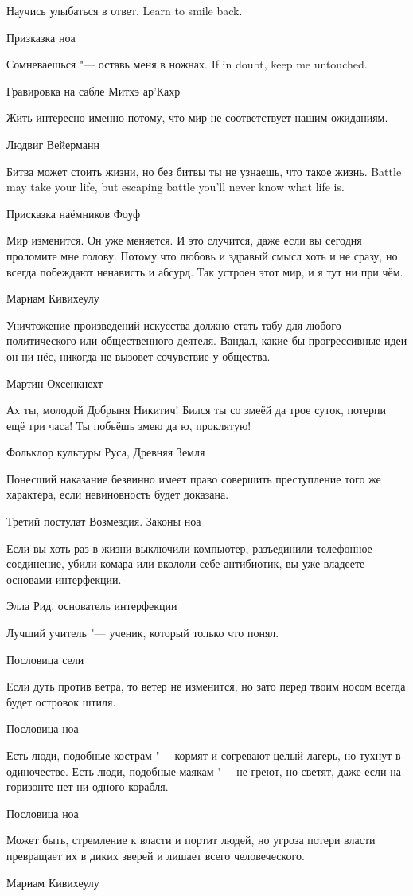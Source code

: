 \epigraph{
{Научись улыбаться в ответ.}
{Learn to smile back.}
}{Призказка ноа}

\epigraph
{
{Сомневаешься "--- оставь меня в ножнах.}
{If in doubt, keep me untouched.}}
{Гравировка на сабле Митхэ ар'Кахр}

\epigraph
{Жить интересно именно потому, что мир не соответствует нашим ожиданиям.}
{Людвиг Вейерманн}

\epigraph{
{Битва может стоить жизни, но без битвы ты не узнаешь, что такое жизнь.}
{Battle may take your life, but escaping battle you'll never know what life is.}
}{Присказка наёмников Фоуф}

\epigraph
{Мир изменится.
Он уже меняется.
И это случится, даже если вы сегодня проломите мне голову.
Потому что любовь и здравый смысл хоть и не сразу, но всегда побеждают ненависть и абсурд.
Так устроен этот мир, и я тут ни при чём.}
{Мариам Кивихеулу}

\epigraph
{Уничтожение произведений искусства должно стать табу для любого политического или общественного деятеля.
Вандал, какие бы прогрессивные идеи он ни нёс, никогда не вызовет сочувствие у общества.}
{Мартин Охсенкнехт}

\epigraph
{Ах ты, молодой Добрыня Никитич!
Бился ты со змеёй да трое суток, потерпи ещё три часа!
Ты побьёшь змею да ю, проклятую!}
{Фольклор культуры Руса, Древняя Земля}

\epigraph
{Понесший наказание безвинно имеет право совершить преступление того же характера, если невиновность будет доказана.}
{Третий постулат Возмездия.
Законы ноа}

\epigraph
{Если вы хоть раз в жизни выключили компьютер, разъединили телефонное соединение, убили комара или вкололи себе антибиотик, вы уже владеете основами интерфекции.}
{Элла Рид, основатель интерфекции}

\epigraph
{Лучший учитель "--- ученик, который только что понял.}
{Пословица сели}

\epigraph
{Если дуть против ветра, то ветер не изменится, но зато перед твоим носом всегда будет островок штиля.}
{Пословица ноа}

\epigraph
{Есть люди, подобные кострам "--- кормят и согревают целый лагерь, но тухнут в одиночестве.
Есть люди, подобные маякам "--- не греют, но светят, даже если на горизонте нет ни одного корабля.}
{Пословица ноа}

\epigraph
{Может быть, стремление к власти и портит людей, но угроза потери власти превращает их в диких зверей и лишает всего человеческого.}
{Мариам Кивихеулу}

